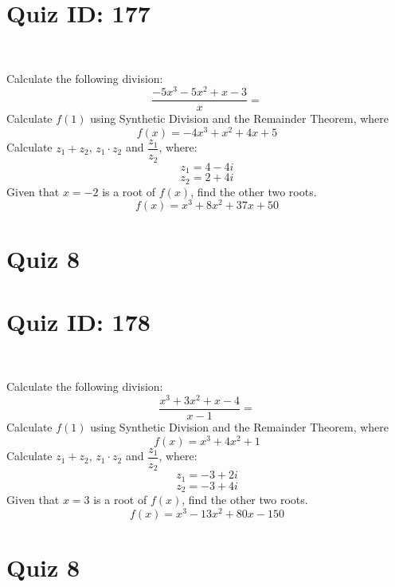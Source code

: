 \documentclass{exam}
\begin{document}
\section*{Quiz ID: 177}
\vspace{0.5cm}\
\vspace{1cm}\
\begin{questions}
\question Calculate the following division:\[\dfrac{
-5x^3 - 5x^2 + x - 3}{
x}=\] \makeemptybox{\stretch{2}}
\question Calculate $f(1)$ using Synthetic Division and the Remainder Theorem, where\[f(x) = 
-4x^3 + x^2 + 4x + 5\]
\newpage\question Calculate $z_1+z_2$, $z_1\cdot z_2$ and $\dfrac{z_1}{z_2}$, where:\[z_1=4-4\mathit{i}\]\[z_2=2+4\mathit{i}\]
\question Given that $x=-2$ is a root of $f(x)$, find the other two roots.\[f(x)=
x^3 + 8x^2 + 37x + 50\]\makeemptybox{\stretch{1}}
\end{questions}\newpage
\newpage
\section*{Quiz 8}
\section*{Quiz ID: 178}
\vspace{0.5cm}\
\vspace{1cm}\
\begin{questions}
\question Calculate the following division:\[\dfrac{
x^3 + 3x^2 + x - 4}{
x - 1}=\] 
\question Calculate $f(1)$ using Synthetic Division and the Remainder Theorem, where\[f(x) = 
x^3 + 4x^2 + 1\]
\newpage\question Calculate $z_1+z_2$, $z_1\cdot z_2$ and $\dfrac{z_1}{z_2}$, where:\[z_1=-3+2\mathit{i}\]\[z_2=-3+4\mathit{i}\]\makeemptybox{\stretch{1}}
\question Given that $x=3$ is a root of $f(x)$, find the other two roots.\[f(x)=
x^3 - 13x^2 + 80x - 150\]\makeemptybox{\stretch{1}}
\end{questions}\newpage
\newpage
\section*{Quiz 8}
\end{document}
